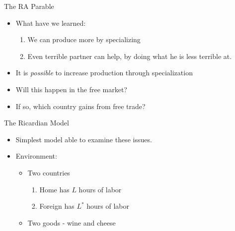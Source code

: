 \documentclass[ignorenonframetext,]{beamer}
\begin{document}
\begin{frame}{The RA Parable}

    \begin{itemize}
        \item What have we learned:
        \begin{enumerate}
            \item We can produce more by specializing
            \item Even terrible partner can help, by doing what he is less terrible at.
        \end{enumerate}
        \item It is \emph{possible} to increase production through specialization
        \item Will this happen in the free market?
        \item If so, which country gains from free trade?
    \end{itemize}

\end{frame}

\begin{frame}{The Ricardian Model}

    \begin{itemize}
        \item Simplest model able to examine these issues.
        \item Environment:
        \begin{itemize}
            \item Two countries
            \begin{enumerate}
                \item Home has $L$ hours of labor
                \item Foreign has $L^*$ hours of labor
            \end{enumerate}
            \item Two goods - wine and cheese
        \end{itemize}
    \end{itemize}

\end{frame}
\end{document}
